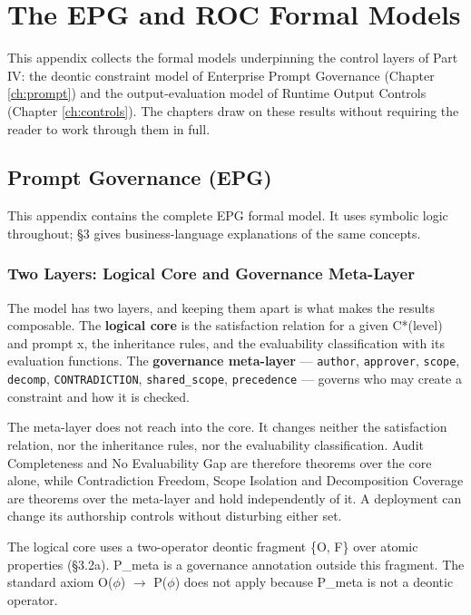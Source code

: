 \chapter{The EPG and ROC Formal Models}
\label{ch:formal-model}


This appendix collects the formal models underpinning the control layers of
Part IV: the deontic constraint model of Enterprise Prompt Governance (Chapter \ref{ch:prompt})
and the output-evaluation model of Runtime Output Controls (Chapter \ref{ch:controls}). The
chapters draw on these results without requiring the reader to work through them
in full.

\section{Prompt Governance (EPG)}
\label{sec:formal-model-A-1}


This appendix contains the complete EPG formal model. It uses symbolic logic throughout; \S{}3 gives business-language explanations of the same concepts.

\subsection{Two Layers: Logical Core and Governance Meta-Layer}


The model has two layers, and keeping them apart is what makes the results composable. The \textbf{logical core} is the satisfaction relation for a given C*(level) and prompt x, the inheritance rules, and the evaluability classification with its evaluation functions. The \textbf{governance meta-layer} --- \texttt{author}, \texttt{approver}, \texttt{scope}, \texttt{decomp}, \texttt{CONTRADICTION}, \texttt{shared\_\allowbreak{}scope}, \texttt{precedence} --- governs who may create a constraint and how it is checked.

The meta-layer does not reach into the core. It changes neither the satisfaction relation, nor the inheritance rules, nor the evaluability classification. Audit Completeness and No Evaluability Gap are therefore theorems over the core alone, while Contradiction Freedom, Scope Isolation and Decomposition Coverage are theorems over the meta-layer and hold independently of it. A deployment can change its authorship controls without disturbing either set.

The logical core uses a two-operator deontic fragment \{O, F\} over atomic properties (\S{}3.2a). P\_\allowbreak{}meta is a governance annotation outside this fragment. The standard axiom O($\phi$) $\to$ P($\phi$) does not apply because P\_\allowbreak{}meta is not a deontic operator.

